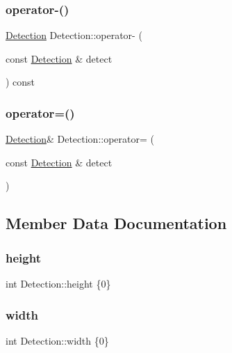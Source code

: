 \subsubsection{\texorpdfstring{operator-\/()}{operator-()}}
{\footnotesize\ttfamily \hyperlink{struct_detection}{Detection} Detection\+::operator-\/ (\begin{DoxyParamCaption}\item[{const \hyperlink{struct_detection}{Detection} \&}]{detect }\end{DoxyParamCaption}) const}

\mbox{\label{struct_detection_a98d5bca326ea2f369156fb07be1f5466}} 
\subsubsection{\texorpdfstring{operator=()}{operator=()}}
{\footnotesize\ttfamily \hyperlink{struct_detection}{Detection}\& Detection\+::operator= (\begin{DoxyParamCaption}\item[{const \hyperlink{struct_detection}{Detection} \&}]{detect }\end{DoxyParamCaption})}



\subsection{Member Data Documentation}
\mbox{\label{struct_detection_a4f3d0bf4072f7e5a200767ab3d838fe2}} 
\subsubsection{\texorpdfstring{height}{height}}
{\footnotesize\ttfamily int Detection\+::height \{0\}}

\mbox{\label{struct_detection_af88e469657d3bc4807caff6c5f9e9475}} 
\subsubsection{\texorpdfstring{width}{width}}
{\footnotesize\ttfamily int Detection\+::width \{0\}}

